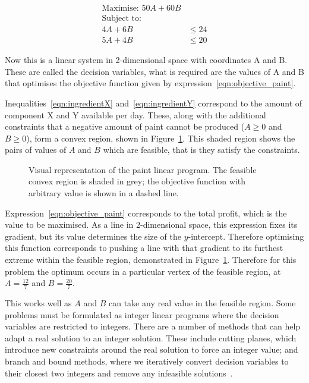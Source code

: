 \begin{align}
\text{Maximise: } 50 A + 60 B & \label{eqn:objective_paint} \\
\text{Subject to: } & \nonumber \\
4 A + 6 B &\leq 24 \label{eqn:ingredientX} \\
5 A + 4 B &\leq 20 \label{eqn:ingredientY}
\end{align}

Now this is a linear system in 2-dimensional space with coordinates A and B.
These are called the decision variables, what is required are the values of A
and B that optimises the objective function given by
expression~\ref{eqn:objective_paint}.

Inequalities~\ref{eqn:ingredientX} and~\ref{eqn:ingredientY} correspond to the
amount of component X and Y available per day. These, along with the additional
constraints that a negative amount of paint cannot be produced (\(A \geq 0\) and
\(B \geq 0\)), form a convex region, shown in Figure~\ref{fig:paint_lp}.
This shaded region shows the pairs of values of \(A\) and \(B\) which are
feasible, that is they satisfy the constraints.

\begin{figure}
\begin{center}

\end{center}
\caption{Visual representation of the paint linear program. The feasible convex
region is shaded in grey; the objective function with arbitrary value is shown
in a dashed line.}
\label{fig:paint_lp}
\end{figure}

Expression~\ref{eqn:objective_paint} corresponds to the total profit, which is
the value to be maximised. As a line in 2-dimensional space,
this expression fixes its gradient, but its value determines the size of the
\(y\)-intercept. Therefore optimising this function corresponds to pushing a line
with that gradient to its furthest extreme within the feasible region,
demonstrated in Figure~\ref{fig:paint_lp}.
Therefore for this problem the optimum occurs in a particular vertex of the
feasible region, at \(A = \frac{12}{7}\) and \(B = \frac{20}{7}\).

This works well as \(A\) and \(B\) can take any real value in the feasible region.
Some problems must be formulated as integer linear programs where the decision
variables are restricted to integers. There are a number of methods that can
help adapt a real solution to an integer solution. These include cutting
planes, which introduce new constraints around the real solution to force an
integer value; and branch and bound methods, where we iteratively convert
decision variables to their closest two integers and remove any infeasible
solutions~\cite{conforti2014integer}.

